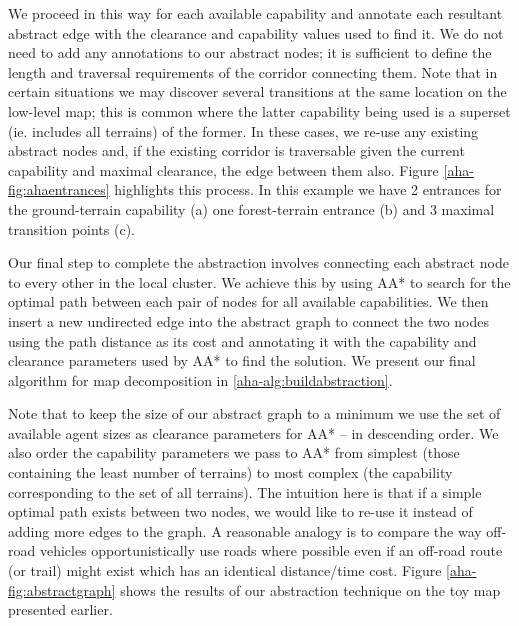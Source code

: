 We proceed in this way for each available capability and annotate each resultant abstract edge with the clearance and capability values used to find it. We do not need to add any annotations to our abstract nodes; it is sufficient to define the length and traversal requirements of the corridor connecting them. Note that in certain situations we may discover several transitions at the same location on the low-level map; this is common where the latter capability being used is a superset (ie. includes all terrains) of the former. In these cases, we re-use any existing abstract nodes and, if the existing corridor is traversable given the current capability and maximal clearance, the edge between them also. Figure \ref{aha-fig:ahaentrances} highlights this process. In this example we have 2 entrances for the ground-terrain capability (a) one forest-terrain entrance (b) and 3 maximal transition points (c).

Our final step to complete the abstraction involves connecting each abstract node to every other in the local cluster. We achieve this by using AA* to search for the optimal path between each pair of nodes for all available capabilities. We then insert a new undirected edge into the abstract graph to connect the two nodes using the path distance as its cost and annotating it with the capability and clearance parameters used by AA* to find the solution. We present our final algorithm for map decomposition in \ref{aha-alg:buildabstraction}.



Note that to keep the size of our abstract graph to a minimum we use the set of available agent sizes as clearance parameters for AA* -- in descending order. We also order the capability parameters we pass to AA* from simplest (those containing the least number of terrains) to most complex (the capability corresponding to the set of all terrains). The intuition here is that if a simple optimal path exists between two nodes, we would like to re-use it instead of adding more edges to the graph. A reasonable analogy is to compare the way off-road vehicles opportunistically use roads where possible even if an off-road route (or trail) might exist which has an identical distance/time cost. Figure \ref{aha-fig:abstractgraph} shows the results of our abstraction technique on the toy map presented earlier.

